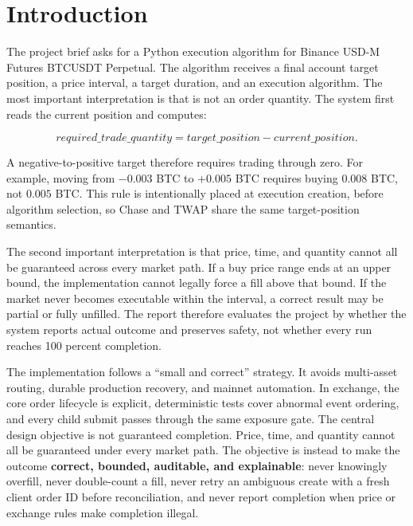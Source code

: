 \section{Introduction}

The project brief asks for a Python execution algorithm for Binance USD-M Futures BTCUSDT Perpetual. The algorithm receives a final account target position, a price interval, a target duration, and an execution algorithm. The most important interpretation is that  is not an order quantity. The system first reads the current position and computes:

\begin{equation}
  required\_trade\_quantity = target\_position - current\_position.
\end{equation}

A negative-to-positive target therefore requires trading through zero. For example, moving from \(-0.003\) BTC to \(+0.005\) BTC requires buying \(0.008\) BTC, not \(0.005\) BTC. This rule is intentionally placed at execution creation, before algorithm selection, so Chase and TWAP share the same target-position semantics.

The second important interpretation is that price, time, and quantity cannot all be guaranteed across every market path. If a buy price range ends at an upper bound, the implementation cannot legally force a fill above that bound. If the market never becomes executable within the interval, a correct result may be partial or fully unfilled. The report therefore evaluates the project by whether the system reports actual outcome and preserves safety, not whether every run reaches 100 percent completion.

The implementation follows a ``small and correct'' strategy. It avoids multi-asset routing, durable production recovery, and mainnet automation. In exchange, the core order lifecycle is explicit, deterministic tests cover abnormal event ordering, and every child submit passes through the same exposure gate. The central design objective is not guaranteed completion. Price, time, and quantity cannot all be guaranteed under every market path. The objective is instead to make the outcome \textbf{correct, bounded, auditable, and explainable}: never knowingly overfill, never double-count a fill, never retry an ambiguous create with a fresh client order ID before reconciliation, and never report completion when price or exchange rules make completion illegal.

